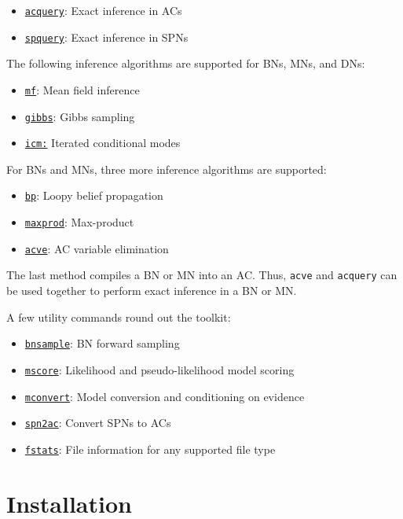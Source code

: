 \documentclass[11pt]{article}
\newcommand{\compactlist}{
  \setlength{\itemsep}{1pt}
  \setlength{\parskip}{0pt}
  \setlength{\parsep}{0pt}
}
\begin{document}
\begin{itemize}
\compactlist
\item \hyperref[sec:acquery]{{\tt acquery}}: Exact inference in ACs
\item \hyperref[sec:spquery]{{\tt spquery}}: Exact inference in SPNs
\end{itemize}
The following inference algorithms are supported for BNs, MNs,
and DNs:
\begin{itemize}
\compactlist
\item \hyperref[sec:mf]{{\tt mf}}: Mean field inference~\cite{lowd&shamaei11}
\item \hyperref[sec:gibbs]{{\tt gibbs}}: Gibbs sampling
\item \hyperref[sec:icm]{{\tt icm:}} Iterated conditional modes~\cite{besag86}
\end{itemize}
For BNs and MNs, three more inference algorithms are supported:
\begin{itemize}
\compactlist
\item \hyperref[sec:bp]{{\tt bp}}: Loopy belief propagation~\cite{murphy&al99}
\item \hyperref[sec:maxprod]{{\tt maxprod}}: Max-product
\item \hyperref[sec:acve]{{\tt acve}}: AC variable elimination~\cite{chavira&darwiche07}
\end{itemize}
The last method compiles a BN or MN into an AC.  Thus, {\tt acve} and
{\tt acquery} can be used together to perform exact inference in a BN
or MN.

A few utility commands round out the toolkit:
\begin{itemize}
\compactlist
\item \hyperref[sec:bnsample]{{\tt bnsample}}: BN forward sampling
\item \hyperref[sec:mscore]{{\tt mscore}}: Likelihood and pseudo-likelihood model scoring
\item \hyperref[sec:mconvert]{{\tt mconvert}}: Model conversion and conditioning on evidence
\item \hyperref[sec:spn2ac]{{\tt spn2ac}}: Convert SPNs to ACs
\item \hyperref[sec:fstats]{{\tt fstats}}: File information for any supported file type
\end{itemize}

\section{Installation}
\end{document}
